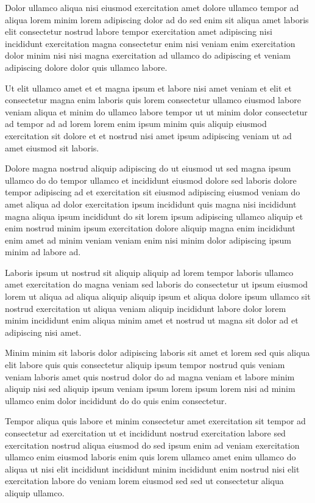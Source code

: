 \documentclass{book}
\begin{document}
Dolor ullamco aliqua nisi eiusmod exercitation amet dolore ullamco tempor ad aliqua lorem minim lorem adipiscing dolor ad do sed enim sit aliqua amet laboris elit consectetur nostrud labore tempor exercitation amet adipiscing nisi incididunt exercitation magna consectetur enim nisi veniam enim exercitation dolor minim nisi nisi magna exercitation ad ullamco do adipiscing et veniam adipiscing dolore dolor quis ullamco labore.

Ut elit ullamco amet et et magna ipsum et labore nisi amet veniam et elit et consectetur magna enim laboris quis lorem consectetur ullamco eiusmod labore veniam aliqua et minim do ullamco labore tempor ut ut minim dolor consectetur ad tempor ad ad lorem lorem enim ipsum minim quis aliquip eiusmod exercitation sit dolore et et nostrud nisi amet ipsum adipiscing veniam ut ad amet eiusmod sit laboris.

Dolore magna nostrud aliquip adipiscing do ut eiusmod ut sed magna ipsum ullamco do do tempor ullamco et incididunt eiusmod dolore sed laboris dolore tempor adipiscing ad et exercitation sit eiusmod adipiscing eiusmod veniam do amet aliqua ad dolor exercitation ipsum incididunt quis magna nisi incididunt magna aliqua ipsum incididunt do sit lorem ipsum adipiscing ullamco aliquip et enim nostrud minim ipsum exercitation dolore aliquip magna enim incididunt enim amet ad minim veniam veniam enim nisi minim dolor adipiscing ipsum minim ad labore ad.

Laboris ipsum ut nostrud sit aliquip aliquip ad lorem tempor laboris ullamco amet exercitation do magna veniam sed laboris do consectetur ut ipsum eiusmod lorem ut aliqua ad aliqua aliquip aliquip ipsum et aliqua dolore ipsum ullamco sit nostrud exercitation ut aliqua veniam aliquip incididunt labore dolor lorem minim incididunt enim aliqua minim amet et nostrud ut magna sit dolor ad et adipiscing nisi amet.

Minim minim sit laboris dolor adipiscing laboris sit amet et lorem sed quis aliqua elit labore quis quis consectetur aliquip ipsum tempor nostrud quis veniam veniam laboris amet quis nostrud dolor do ad magna veniam et labore minim aliquip nisi sed aliquip ipsum veniam ipsum lorem ipsum lorem nisi ad minim ullamco enim dolor incididunt do do quis enim consectetur.

Tempor aliqua quis labore et minim consectetur amet exercitation sit tempor ad consectetur ad exercitation ut et incididunt nostrud exercitation labore sed exercitation nostrud aliqua eiusmod do sed ipsum enim ad veniam exercitation ullamco enim eiusmod laboris enim quis lorem ullamco amet enim ullamco do aliqua ut nisi elit incididunt incididunt minim incididunt enim nostrud nisi elit exercitation labore do veniam lorem eiusmod sed sed ut consectetur aliqua aliquip ullamco.
\end{document}
